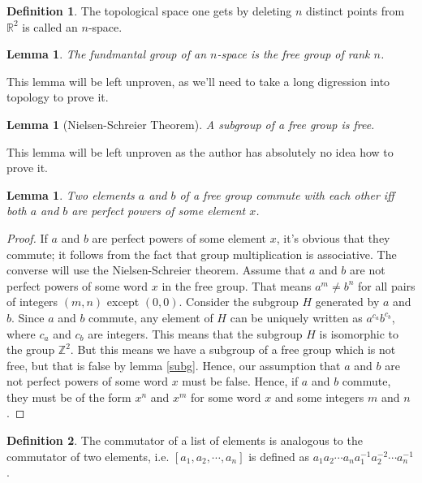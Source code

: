 \documentclass[12pt]{article}
\newtheorem{lem}[thm]{Lemma}
\theoremstyle{definition}
\newtheorem{defn}{Definition}[section]
\begin{document}
\begin{defn}
The topological space one gets by deleting $n$ distinct points from $\mathbb{R}^2$ is called an $n$-space.
\end{defn}

\begin{lem}
The fundmantal group of an $n$-space is the free group of rank $n$.
\end{lem}

This lemma will be left unproven, as we'll need to take a long digression into topology to prove it.

\begin{lem}[Nielsen-Schreier Theorem]\label{subg}
A subgroup of a free group is free.
\end{lem}

This lemma will be left unproven as the author has absolutely no idea how to prove it.

\begin{lem}\label{impo}
Two elements $a$ and $b$ of a free group commute with each other iff both $a$ and $b$ are perfect powers of some element $x$.
\end{lem}

\begin{proof}
If $a$ and $b$ are perfect powers of some element $x$, it's obvious that they commute; it follows from the fact that group multiplication is associative. The converse will use the Nielsen-Schreier theorem. Assume that $a$ and $b$ are not perfect powers of some word $x$ in the free group. That means $a^m \neq b^n$ for all pairs of integers $(m,n)$ except $(0,0)$. Consider the subgroup $H$ generated by $a$ and $b$. Since $a$ and $b$ commute, any element of $H$ can be uniquely written as $a^{c_a}b^{c_b}$, where $c_a$ and $c_b$ are integers. This means that the subgroup $H$ is isomorphic to the group $\mathbb{Z}^2$. But this means we have a subgroup of a free group which is not free, but that is false by lemma \autoref{subg}. Hence, our assumption that $a$ and $b$ are not perfect powers of some word $x$ must be false. Hence, if $a$ and $b$ commute, they must be of the form $x^n$ and $x^m$ for some word $x$ and some integers $m$ and $n$.
\end{proof}

\begin{defn}
The commutator of a list of elements is analogous to the commutator of two elements, i.e. $[a_1, a_2, \cdots, a_n]$ is defined as $a_1a_2\cdots a_na_1^{-1}a_2^{-2}\cdots a_n^{-1}$.
\end{defn}
\end{document}
